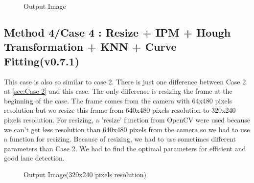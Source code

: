 \begin{figure}[H]
  \centering
  \caption{Output Image}
\end{figure}

\subsection{Method 4/Case 4 : Resize + IPM + Hough Transformation + KNN + Curve Fitting(v0.7.1)}\label{sec:Case 4}

This case is also so similar to case 2. There is just one difference between Case 2 at \ref{sec:Case 2} and this case. The only difference is resizing the frame at the beginning of the case. The frame comes from the camera with 64x480 pixels resolution but we resize this frame from 640x480 pixels resolution to 320x240 pixels resolution. For resizing, a 'resize' function from OpenCV were used because we can't get less resolution than 640x480 pixels from the camera so we had to use a function for resizing. Because of resizing, we had to use sometimes different parameters than Case 2. We had to find the optimal parameters for efficient and good lane detection.

\begin{figure}[H]
  \centering
  \caption{Output Image(320x240 pixels resolution)}
\end{figure}

%
